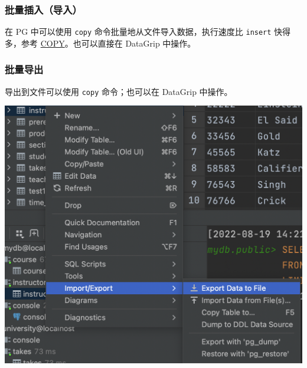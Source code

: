 \documentclass[aspectratio=169, 14pt]{beamer}
\begin{document}
\begin{frame}
	\frametitle{批量插入（导入）}

	{\Huge {}  }

	在 PG 中可以使用 \texttt{copy} 命令批量地从文件导入数据，执行速度比 \texttt{insert} 快得多，参考 \href{https://www.postgresql.org/docs/14/sql-copy.html}{COPY}。也可以直接在 DataGrip 中操作。

\end{frame}

\begin{frame}
	\frametitle{批量导出}
	导出到文件可以使用 \texttt{copy} 命令；也可以在 DataGrip 中操作。

	\begin{center}
		\includegraphics[height=.7\paperheight]{week6/export}
	\end{center}

\end{frame}
\end{document}

